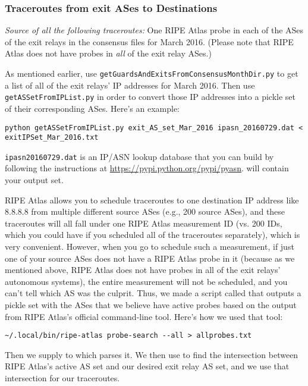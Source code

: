 \documentclass{article}
\begin{document}
\subsubsection{Traceroutes from exit ASes to Destinations}
\emph{Source of all the following traceroutes:} One RIPE Atlas probe in each of the ASes of the 
exit relays in the consensus files for March 2016. (Please note that RIPE Atlas does not 
have probes in \emph{all} of the exit relay ASes.)

As mentioned earlier, use {\tt getGuardsAndExitsFromConsensusMonthDir.py} to get a 
list of all of the exit relays' IP addresses for March 2016. 
Then use {\tt getASSetFromIPList.py} 
in order to convert those IP addresses into a pickle set 
of their corresponding ASes. Here's an example:
\begin{lstlisting}
python getASSetFromIPList.py exit_AS_set_Mar_2016 ipasn_20160729.dat < exitIPSet_Mar_2016.txt
\end{lstlisting}
{\tt ipasn\textunderscore 20160729.dat} is an IP/ASN lookup database that you can build 
by following the instructions at \url{https://pypi.python.org/pypi/pyasn}.
 will contain your output set.

RIPE Atlas allows you to schedule traceroutes to one destination IP address 
like 8.8.8.8 from multiple different source ASes (e.g., 200 source ASes), and these 
traceroutes will all fall under one RIPE Atlas measurement ID (vs. 200 IDs, which 
you could have if you scheduled all of the traceroutes separately), which is very 
convenient. However, when you go to schedule such a measurement, if just one of your 
source ASes does not have a RIPE Atlas probe in it (because as we mentioned above, 
RIPE Atlas does not have probes in all of the exit relays' autonomous systems),
the entire measurement will not be 
scheduled, and you can't tell which AS was the culprit. Thus, we made a script 
called  that outputs a pickle set with the 
ASes that we believe have active probes based on the output from RIPE Atlas's 
official command-line tool. Here's how we used that tool:
\begin{lstlisting}
~/.local/bin/ripe-atlas probe-search --all > allprobes.txt
\end{lstlisting}
Then we supply  to  which 
parses it. We then use 
to find the intersection 
between RIPE Atlas's active AS set and our desired exit relay AS set, and 
we use that intersection for our traceroutes.
\end{document}
